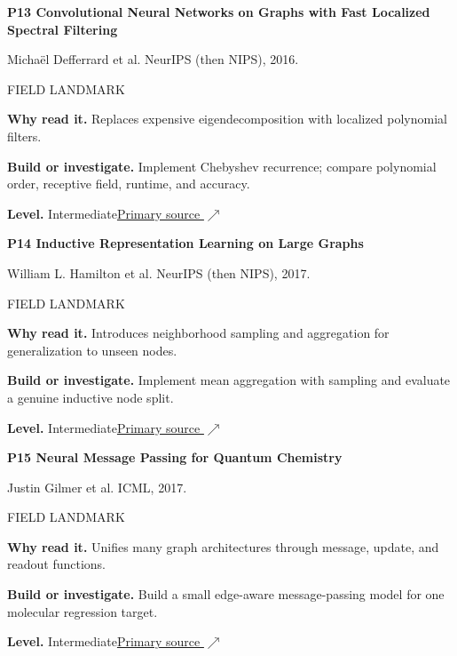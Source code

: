 \documentclass[11pt,letterpaper]{article}
\begin{document}
\begin{minipage}{\linewidth}
{\large\bfseries P13 Convolutional Neural Networks on Graphs with Fast Localized Spectral Filtering}\par
Michaël Defferrard et al. NeurIPS (then NIPS), 2016.\par
\textcolor{ink}{\small FIELD LANDMARK}\par
\textbf{Why read it.} Replaces expensive eigendecomposition with localized polynomial filters.\par
\textbf{Build or investigate.} Implement Chebyshev recurrence; compare polynomial order, receptive field, runtime, and accuracy.\par
\textbf{Level.} Intermediate\quad\href{https://arxiv.org/abs/1606.09375}{Primary source $\nearrow$}\par
\end{minipage}\par\vspace{10pt}
\begin{minipage}{\linewidth}
{\large\bfseries P14 Inductive Representation Learning on Large Graphs}\par
William L. Hamilton et al. NeurIPS (then NIPS), 2017.\par
\textcolor{ink}{\small FIELD LANDMARK}\par
\textbf{Why read it.} Introduces neighborhood sampling and aggregation for generalization to unseen nodes.\par
\textbf{Build or investigate.} Implement mean aggregation with sampling and evaluate a genuine inductive node split.\par
\textbf{Level.} Intermediate\quad\href{https://arxiv.org/abs/1706.02216}{Primary source $\nearrow$}\par
\end{minipage}\par\vspace{10pt}
\begin{minipage}{\linewidth}
{\large\bfseries P15 Neural Message Passing for Quantum Chemistry}\par
Justin Gilmer et al. ICML, 2017.\par
\textcolor{ink}{\small FIELD LANDMARK}\par
\textbf{Why read it.} Unifies many graph architectures through message, update, and readout functions.\par
\textbf{Build or investigate.} Build a small edge-aware message-passing model for one molecular regression target.\par
\textbf{Level.} Intermediate\quad\href{https://proceedings.mlr.press/v70/gilmer17a.html}{Primary source $\nearrow$}\par
\end{minipage}\par\vspace{10pt}
\end{document}
